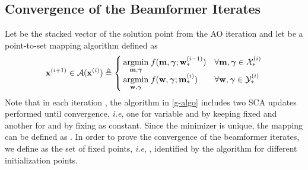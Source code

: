 \subsection{Convergence of the Beamformer Iterates} \label{c-b}
Let  be the stacked vector of the solution point from the  \ac{AO} iteration and let  be a point-to-set mapping algorithm defined as
\begin{equation} \label{g-algo}
\iterate{\ma}{i+1} \in \mc{A}(\iterate{\ma}{i}) \triangleq
\begin{cases}
\underset{\mx,\mz}{\mathrm{argmin}} \; f(\mx,\mz;\iter{\my}{\ast}{i-1})& \forall \mx,\mz \in \iter{\mc{X}}{\ast}{i} \\
\underset{\my,\mz}{\mathrm{argmin}} \; f(\my,\mz;\iter{\mx}{\ast}{i})& \forall \my,\mz \in \iter{\mc{Y}}{\ast}{i} 
\end{cases} 
\end{equation}
Note that in each iteration , the algorithm  in \eqref{g-algo} includes two \ac{SCA} updates performed until convergence, \textit{i.e}, one for variable \me{\mx} and \me{\mz} by keeping \me{\my} fixed and another for \me{\my} and \me{\mz} by fixing \me{\mx} as constant. Since the minimizer is unique, the mapping can be defined as . In order to prove the convergence of the beamformer iterates, we define  as the set of fixed points, \textit{i.e}, , identified by the algorithm  for different initialization points. 

